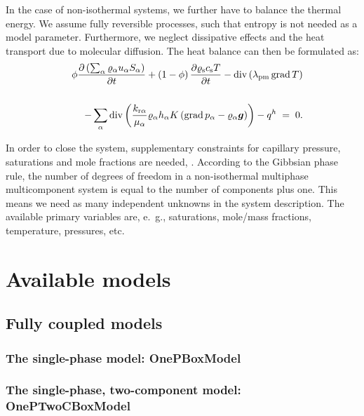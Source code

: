 In the case of non-isothermal systems, we further have to balance the
thermal energy. We assume fully reversible processes, such that entropy
is not needed as a model parameter. Furthermore, we neglect 
dissipative effects and the heat transport due to molecular
diffusion. The heat balance can then be
formulated as:
%
\begin{eqnarray}
  \label{A3:eqenergmak1}
  && \phi \frac{\partial \left( \sum_\alpha \varrho_{\alpha}
      u_\alpha S_\alpha \right)}{\partial t} + \left( 1 -
    \phi \right) \frac{\partial \varrho_{\text{s}} c_{\text{s}}
    T}{\partial t} \nonumber 
 - \operatorname{div} \left( \lambda_{\text{pm}} \operatorname{grad} T \right)
  \nonumber \\
  \nonumber \\
  && - \sum\limits_\alpha \operatorname{div} \left( \frac{k_{\text{r}
        \alpha}}{\mu_\alpha} \varrho_{\alpha} h_\alpha
    K \left( \operatorname{grad} p_\alpha - \varrho_{\alpha}
      \boldsymbol{g} \right) \right) \nonumber 
 - q^h \; = \; 0.
\end{eqnarray}

In order to close the system, supplementary constraints for capillary pressure, saturations and mole
fractions are needed, \cite{A3:helmig:1997}. 
According to the Gibbsian phase rule, the number of degrees of freedom
in a non-isothermal multiphase multicomponent system is equal to the
number of components plus one. This means we need as many independent
unknowns in the system description. The
available primary variables are, e.\ g., saturations, mole/mass
fractions, temperature, pressures, etc.




\section{Available models} 

\subsection{Fully coupled models} 

\subsubsection{The single-phase model: OnePBoxModel} 


\subsubsection{The single-phase, two-component model:  OnePTwoCBoxModel} 


